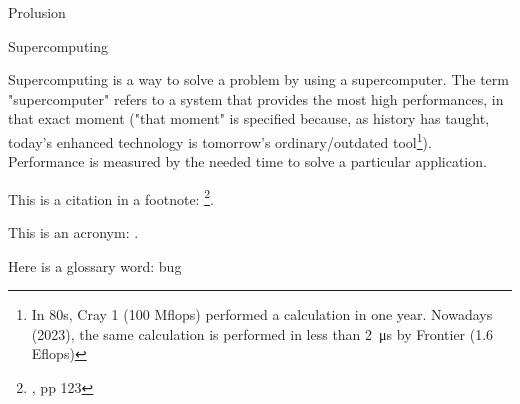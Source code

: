 \begin{chapter}{Prolusion}
    \begin{section}{Supercomputing}
        \par Supercomputing is a way to solve a problem by using a supercomputer. The term "supercomputer" refers to a system that provides the most high performances, in that exact moment ("that moment" is specified because, as history has taught, today's enhanced technology is tomorrow's ordinary/outdated tool\footnote{In 80s, Cray 1 (100 Mflops) performed a calculation in one year. Nowadays (2023), the same calculation is performed in less than \SI{2}{\micro\second} by Frontier (1.6 Eflops)}). Performance is measured by the needed time to solve a particular application.
        \par This is a citation in a footnote: \footnote{\cite{martin2009clean}, pp 123}.
        \par This is an acronym: .
        \par Here is a glossary word: \gls{bug}
    \end{section}
\end{chapter}
